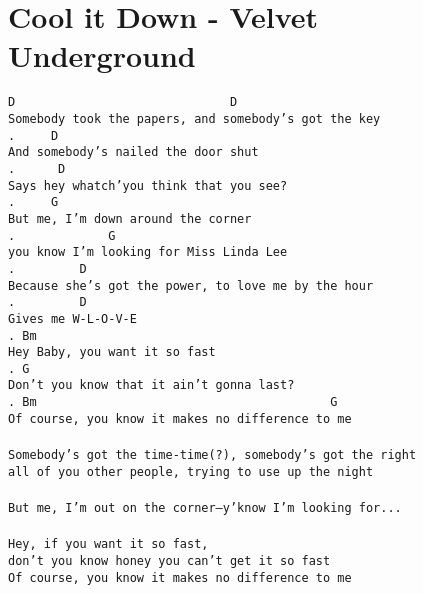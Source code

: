 \newpage
\section{Cool it Down - Velvet Underground}
\label{Cool it Down - Velvet Underground}
\texttt{D\ \ \ \ \ \ \ \ \ \ \ \ \ \ \ \ \ \ \ \ \ \ \ \ \ \ \ \ \ \ D\\
Somebody\ took\ the\ papers,\ and\ somebody's\ got\ the\ key\\
. \ \ \ \ D\\
And\ somebody's\ nailed\ the\ door\ shut\\
. \ \ \ \ \ D\\
Says\ hey\ whatch'you\ think\ that\ you\ see?\\
. \ \ \ \ G\\
But\ me,\ I'm\ down\ around\ the\ corner\\
. \ \ \ \ \ \ \ \ \ \ \ \ G\ \ \ \ \ \\
you\ know\ I'm\ looking\ for\ Miss\ Linda\ Lee\\
. \ \ \ \ \ \ \ \ D\\
Because\ she's\ got\ the\ power,\ to\ love\ me\ by\ the\ hour\\
. \ \ \ \ \ \ \ \ D\\
Gives\ me\ W-L-O-V-E\\
. Bm\ \ \ \ \ \ \ \ \ \ \ \ \ \ \ \ \ \ \ \ \ \ \ \ \ \ \ \ \ \ \ \ \ \\
Hey\ Baby,\ you\ want\ it\ so\ fast\ \ \\
. G\\
Don't\ you\ know\ that\ it\ ain't\ gonna\ last?\\
. Bm\ \ \ \ \ \ \ \ \ \ \ \ \ \ \ \ \ \ \ \ \ \ \ \ \ \ \ \ \ \ \ \ \ \ \ \ \ \ \ \ \ G\ \ \ \ \ \ \ \ \ \ \ \ \ \ \ \\
Of\ course,\ you\ know\ it\ makes\ no\ difference\ to\ me\\
\\
Somebody's\ got\ the\ time-time(?),\ somebody's\ got\ the\ right\\
all\ of\ you\ other\ people,\ trying\ to\ use\ up\ the\ night\\
\\
But\ me,\ I'm\ out\ on\ the\ corner--y'know\ I'm\ looking\ for...\\
\\
Hey,\ if\ you\ want\ it\ so\ fast,\ \\
don't\ you\ know\ honey\ you\ can't\ get\ it\ so\ fast\\
Of\ course,\ you\ know\ it\ makes\ no\ difference\ to\ me\\
}
